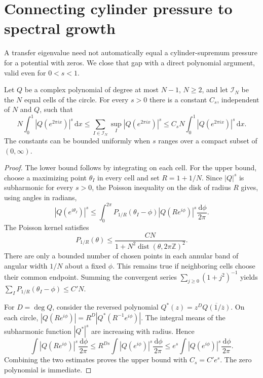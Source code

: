 \documentclass[11pt,a4paper]{article}
\numberwithin{equation}{section}
\theoremstyle{definition}
\theoremstyle{remark}
\newcommand{\ZZ}{\mathbb Z}
\newcommand{\dd}{\,\mathrm d}
\newcommand{\dist}{\operatorname{dist}}
\begin{document}
\section{Connecting cylinder pressure to spectral growth}
\label{sec:comparison}
A transfer eigenvalue need not automatically equal a cylinder-supremum
pressure for a potential with zeros. We close that gap with a direct
polynomial argument, valid even for $0<s<1$.

\begin{lemma}
\label{lem:sampling}
Let $Q$ be a complex polynomial of degree at most $N-1$, $N\ge2$, and
let $\mathcal I_N$ be the $N$ equal cells of the circle. For every $s>0$
there is a constant $C_s$, independent of $N$ and $Q$, such that
\begin{equation}
 N\int_0^1|Q(e^{2\pi ix})|^s\dd x
 \le\sum_{I\in\mathcal I_N}\sup_I |Q(e^{2\pi ix})|^s
 \le C_sN\int_0^1|Q(e^{2\pi ix})|^s\dd x.
 \label{eq:sampling}
\end{equation}
The constants can be bounded uniformly when $s$ ranges over a compact
subset of $(0,\infty)$.
\end{lemma}
\begin{proof}
The lower bound follows by integrating on each cell. For the upper bound,
choose a maximizing point $\theta_I$ in every cell and set $R=1+1/N$.
Since $|Q|^s$ is subharmonic for every $s>0$, the Poisson inequality on
the disk of radius $R$ gives, using angles in radians,
\[
 |Q(e^{i\theta_I})|^s\le
 \int_0^{2\pi}P_{1/R}(\theta_I-\phi)|Q(Re^{i\phi})|^s
 \frac{\dd\phi}{2\pi}.
\]
The Poisson kernel satisfies
\[
 P_{1/R}(\theta)\le
 \frac{C N}{1+N^2\dist(\theta,2\pi\ZZ)^2}.
\]
There are only a bounded number of chosen points in each annular band
of angular width $1/N$ about a fixed $\phi$. This remains true if
neighboring cells choose their common endpoint. Summing the convergent
series $\sum_{j\ge0}(1+j^2)^{-1}$ yields
$\sum_I P_{1/R}(\theta_I-\phi)\le C'N$.

For $D=\deg Q$, consider the reversed polynomial
$Q^*(z)=z^D\overline{Q(1/\overline z)}$.
On each circle,
$|Q(Re^{i\phi})|=R^D|Q^*(R^{-1}e^{i\phi})|$.
The integral means of the subharmonic function $|Q^*|^s$ are increasing
with radius. Hence
\[
 \int|Q(Re^{i\phi})|^s\frac{\dd\phi}{2\pi}
 \le R^{Ds}\int|Q(e^{i\phi})|^s\frac{\dd\phi}{2\pi}
 \le e^s\int|Q(e^{i\phi})|^s\frac{\dd\phi}{2\pi}.
\]
Combining the two estimates proves the upper bound with $C_s=C'e^s$.
The zero polynomial is immediate.
\end{proof}
\end{document}
